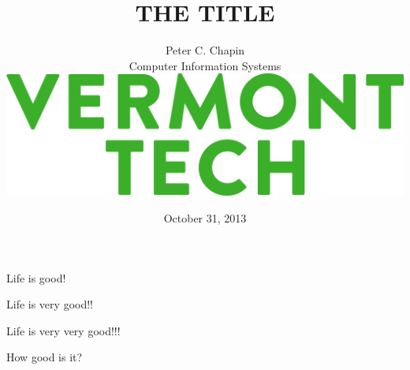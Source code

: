 \documentclass[landscape]{slides}
\title{\color{titlecolor}THE TITLE}
\author{
  \begin{tabular}{c}
  \\[3mm]
  \Large{Peter C. Chapin} \\[2mm]
  \normalsize{Computer Information Systems}\\[5mm]
  \includegraphics[scale=0.80]{Vermont-Tech-Stack.jpg}\\[16mm]
  \end{tabular}
}
\date{October 31, 2013}
\begin{document}
\color{Black}
\pagecolor{Background}

\maketitle

\begin{citemize}
\item Life is good!
\item Life is very good!!
\item Life is very very good!!!
\end{citemize}
How good is it?
\stopslide
\end{document}

